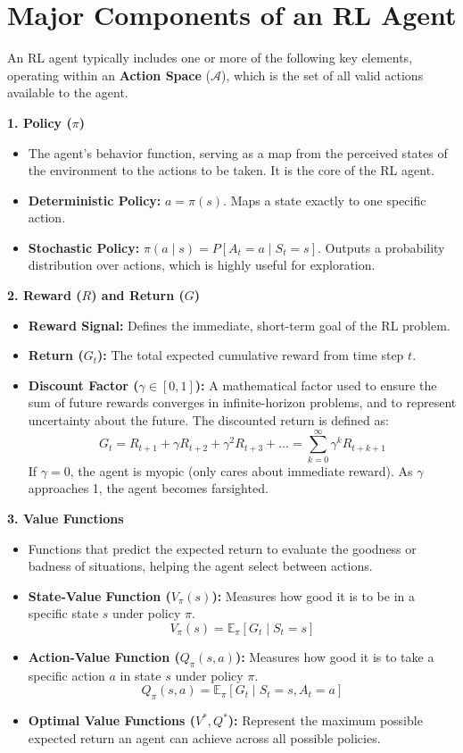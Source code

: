 \section{\textcolor{secondary}{Major Components of an RL Agent}}
An RL agent typically includes one or more of the following key elements, operating within an \textbf{Action Space} ($\mathcal{A}$), which is the set of all valid actions available to the agent.

\vspace{0.5cm}
\textbf{\textcolor{primary}{1. Policy ($\pi$)}}
\begin{itemize}
    \item The agent's behavior function, serving as a map from the perceived states of the environment to the actions to be taken. It is the core of the RL agent.
    \item \textbf{Deterministic Policy:} $a = \pi(s)$. Maps a state exactly to one specific action.
    \item \textbf{Stochastic Policy:} $\pi(a \mid s) = P[A_t = a \mid S_t = s]$. Outputs a probability distribution over actions, which is highly useful for exploration.
\end{itemize}

\textbf{\textcolor{primary}{2. Reward ($R$) and Return ($G$)}}
\begin{itemize}
    \item \textbf{Reward Signal:} Defines the immediate, short-term goal of the RL problem.
    \item \textbf{Return ($G_t$):} The total expected cumulative reward from time step $t$.
    \item \textbf{Discount Factor ($\gamma \in [0, 1]$):} A mathematical factor used to ensure the sum of future rewards converges in infinite-horizon problems, and to represent uncertainty about the future. The discounted return is defined as:
    \[ G_t = R_{t+1} + \gamma R_{t+2} + \gamma^2 R_{t+3} + \dots = \sum_{k=0}^{\infty} \gamma^k R_{t+k+1} \]
    If $\gamma = 0$, the agent is myopic (only cares about immediate reward). As $\gamma$ approaches 1, the agent becomes farsighted.
\end{itemize}

\textbf{\textcolor{primary}{3. Value Functions}}
\begin{itemize}
    \item Functions that predict the expected return to evaluate the goodness or badness of situations, helping the agent select between actions.
    \item \textbf{State-Value Function ($V_\pi(s)$):} Measures how good it is to be in a specific state $s$ under policy $\pi$.
    \[ V_\pi(s) = \mathbb{E}_\pi [G_t \mid S_t = s] \]
    \item \textbf{Action-Value Function ($Q_\pi(s, a)$):} Measures how good it is to take a specific action $a$ in state $s$ under policy $\pi$.
    \[ Q_\pi(s, a) = \mathbb{E}_\pi [G_t \mid S_t = s, A_t = a] \]
    \item \textbf{Optimal Value Functions ($V^*, Q^*$):} Represent the maximum possible expected return an agent can achieve across all possible policies.
\end{itemize}

